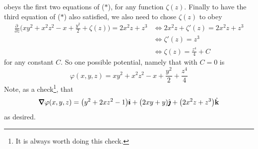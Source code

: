 \begin{eg}
\begin{equation*}
\end{equation*}
obeys the first two equations of ($*$),
for any function $\zeta(z)$. Finally to have the third equation of 
($*$) also satisfied, we also need to chose $\zeta(z)$
to obey
\begin{align*}
\frac{\partial \ }{\partial z}\big(xy^2+x^2z^2-x+\frac{y^2}{2}+\zeta(z)\big) 
 = 2x^2z+z^3 
&\iff 2x^2z +\zeta'(z) = 2x^2z + z^3 \\
&\iff \zeta'(z) = z^3\\
&\iff \zeta(z) = \frac{z^4}{4} + C
\end{align*}
for any constant $C$. So one possible potential, namely that with $C=0$ is
\begin{equation*}
\varphi(x,y,z)
=xy^2+x^2z^2-x+\frac{y^2}{2}+\frac{z^4}{4}
\end{equation*}
Note, as a check\footnote{It is always worth doing this check.}, that
\begin{equation*}
\vnabla \varphi(x,y,z)
=\big(y^2+2xz^2-1\big)\hi+\big(2xy+y)\hj+\big(2x^2z+z^3\big)\hk
\end{equation*}
as desired.
\end{eg}

